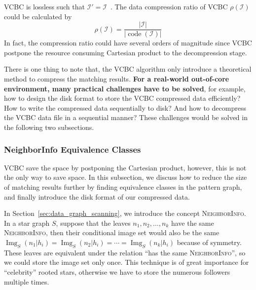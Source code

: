 VCBC is lossless such that $\mathcal{I}' = \mathcal{I}$~\cite{DBLP:journals/pvldb/QiaoZC17}.
The data compression ratio of VCBC $\rho(\mathcal{I})$ could be calculated by
\[ \rho(\mathcal{I}) = \frac{|\mathcal{I}|}{|\operatorname{code}(\mathcal{I})|} \]
In fact, the compression ratio could have several orders of magnitude since VCBC postpone the resource consuming Cartesian product to the decompression stage.

There is one thing to note that, the VCBC algorithm only introduce a theoretical method to compress the matching results.
\textbf{For a real-world out-of-core environment, many practical challenges have to be solved},
for example, how to design the disk format to store the VCBC compressed data efficiently?
How to write the compressed data sequentially to disk?
And how to decompress the VCBC data file in a sequential manner?
These challenges would be solved in the following two subsections.
\subsubsection{NeighborInfo Equivalence Classes}\label{sec:equivalence_classes}
VCBC save the space by postponing the Cartesian product,
however, this is not the only way to save space.
In this subsection, we discuss how to reduce the size of matching results further by finding equivalence classes in the pattern graph, and finally introduce the disk format of our compressed data.

In Section~\ref{sec:data_graph_scanning}, we introduce the concept \textsc{NeighborInfo}.
In a star graph $S$, suppose that the leaves $n_1, n_2, \dots, n_k$ have the same \textsc{NeighborInfo},
then their conditional image set would also be the same $\operatorname{Img}_S(n_1 | h_i) = \operatorname{Img}_S(n_2 | h_i) = \cdots = \operatorname{Img}_S(n_k | h_i)$ because of symmetry.
These leaves are equivalent under the relation ``has the same \textsc{NeighborInfo}'',
so we could store the image set only once.
This technique is of great importance for ``celebrity'' rooted stars,
otherwise we have to store the numerous followers multiple times.

